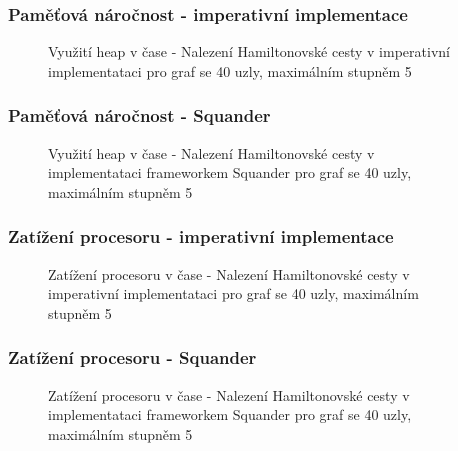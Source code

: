 \documentclass[czech]{beamer}
\begin{document}
\begin{frame}
  \frametitle{Paměťová náročnost - imperativní implementace}

\begin{figure}
\resizebox{0.7\textwidth}{!}{}

\caption{\tiny Využití heap v čase - Nalezení Hamiltonovské
cesty v imperativní implementataci pro graf se 40 uzly, maximálním stupněm 5}
\label{fig:hpIMem405}
\end{figure}

\end{frame}


\begin{frame}
  \frametitle{Paměťová náročnost - Squander}

\begin{figure}
\resizebox{0.7\textwidth}{!}{}

\caption{\tiny Využití heap v čase - Nalezení Hamiltonovské
cesty v implementataci frameworkem Squander pro graf se 40 uzly, maximálním
stupněm 5}
\label{fig:hpIMem405}
\end{figure}

\end{frame}



\begin{frame}
  \frametitle{Zatížení procesoru - imperativní implementace}
\begin{figure}
\resizebox{0.7\textwidth}{!}{}

\caption{\tiny Zatížení procesoru v čase - Nalezení Hamiltonovské
cesty v imperativní implementataci pro graf se 40 uzly, maximálním stupněm 5}
\label{fig:hpIMem405}
\end{figure}
\end{frame}


\begin{frame}
  \frametitle{Zatížení procesoru - Squander}
\begin{figure}
\resizebox{0.7\textwidth}{!}{}

\caption{\tiny Zatížení procesoru v čase - Nalezení Hamiltonovské
cesty v implementataci frameworkem Squander pro graf se 40 uzly, maximálním stupněm 5}
\label{fig:hpIMem405}
\end{figure}
\end{frame}
\end{document}
